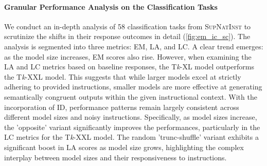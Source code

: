 \vspace{-10pt}
\paragraph{Granular Performance Analysis on the Classification Tasks}

We conduct an in-depth analysis of 58 classification tasks from \textsc{SupNatInst} to scrutinize the shifts in their response outcomes in detail (\autoref{fig:em_ic_sc}). The analysis is segmented into three metrics: EM, LA, and LC. A clear trend emerges: as the model size increases, EM scores also rise. However, when examining the LA and LC metrics based on baseline responses, the T\textit{k}-XL model outperforms the T\textit{k}-XXL model. This suggests that while larger models excel at strictly adhering to provided instructions, smaller models are more effective at generating semantically congruent outputs within the given instructional context. With the incorporation of ID, performance patterns remain largely consistent across different model sizes and noisy instructions. Specifically, as model sizes increase, the 'opposite' variant significantly improves the performances, particularly in the LC metrics for the T\textit{k}-XXL model. The random 'trunc-shuffle' variant exhibits a significant boost in LA scores as model size grows, highlighting the complex interplay between model sizes and their responsiveness to instructions.

